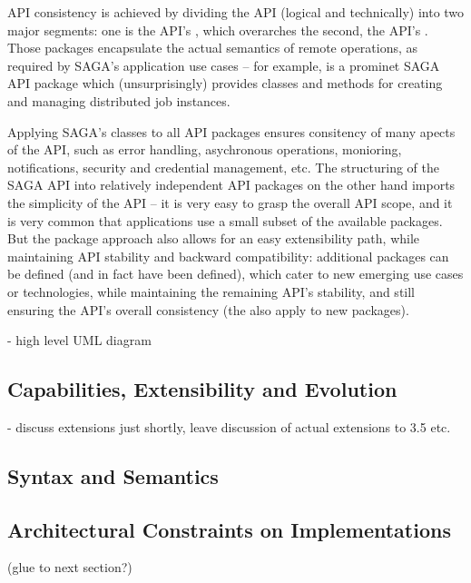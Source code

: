   API consistency is achieved by dividing the API (logical and
  technically) into two major segments: one is the API's \I{\lf},
  which overarches the second, the API's .
  Those packages encapsulate the actual semantics of remote
  operations, as required by SAGA's application use cases -- for
  example,  is a prominet SAGA API package which
  (unsurprisingly) provides classes and methods for creating and
  managing distributed job instances.

  Applying SAGA's \lf classes to all API packages ensures consitency
  of many apects of the API, such as error handling, asychronous
  operations, monioring, notifications, security and credential
  management, etc.  The structuring of the SAGA API into relatively
  independent API packages on the other hand imports the simplicity of
  the API -- it is very easy to grasp the overall API scope, and it is
  very common that applications use a small subset of the available
  packages.  But the package approach also allows for an easy
  extensibility path, while maintaining API stability and backward
  compatibility: additional packages can be defined (and in fact have
  been defined), which cater to new emerging use cases or
  technologies, while maintaining the remaining API's stability, and
  still ensuring the API's overall consistency (the \lf also apply to
  new packages).

  - high level UML diagram\\


 \subsection{Capabilities, Extensibility and Evolution}
  - discuss extensions just shortly, leave discussion of actual extensions to
  3.5 etc.\\

  

 \subsection{Syntax and Semantics}


 \subsection{Architectural Constraints on Implementations}
   (glue to next section?)


